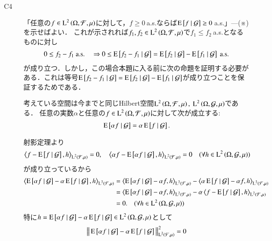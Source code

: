 \begin{prf}
\begin{description}
			\item[C4] 「任意の$f \in \operatorname{L}^{2} \left(\Omega, \mathcal{F},\mu\right)$に対して，$f \geq 0\ $a.s.ならば$\cexp{f}{\mathcal{G}} \geq 0\ $a.s.」---(※)を示せばよい．
				これが示されれば$f_1,f_2 \in \operatorname{L}^{2} \left(\Omega, \mathcal{F},\mu\right)$で$f_1 \leq f_2\ $a.s.となるものに対し
				\begin{align}
					0 \leq f_2 - f_1\ \mathrm{a.s.} \quad \Rightarrow 0 \leq \operatorname{E} \left[ f_2 - f_1 \ \middle|\ \mathcal{G} \right] = \operatorname{E} \left[ f_2 \ \middle|\ \mathcal{G} \right] - \operatorname{E} \left[ f_1 \ \middle|\ \mathcal{G} \right]\ \mathrm{a.s.}
				\end{align}
				が成り立つ．しかし，この場合本題に入る前に次の命題を証明する必要がある．これは等号$\operatorname{E} \left[ f_2 - f_1 \ \middle|\ \mathcal{G} \right] = \operatorname{E} \left[ f_2 \ \middle|\ \mathcal{G} \right] - \operatorname{E} \left[ f_1 \ \middle|\ \mathcal{G} \right]$が成り立つことを保証するためである．
				\begin{prp}
					考えている空間は今までと同じHilbert空間$\operatorname{L}^{2} \left(\Omega, \mathcal{F},\mu\right),\ \operatorname{L}^{2} \left(\Omega, \mathcal{G},\mu\right)$である．
					任意の実数$\alpha$と任意の$f \in \operatorname{L}^{2} \left(\Omega, \mathcal{F},\mu\right)$に対して次が成立する:
					\begin{align}
						\operatorname{E} \left[ \alpha f \ \middle|\ \mathcal{G} \right] = \alpha \operatorname{E} \left[ f \ \middle|\ \mathcal{G} \right].
					\end{align}
				\end{prp}
				\begin{prf}
					射影定理より
					\begin{align}
						\inprod<f - \cexp{f}{\mathcal{G}}, h>_{\Lp{2}{\mathcal{F},\mu}} = 0, \quad \inprod<\alpha f - \cexp{\alpha f}{\mathcal{G}}, h>_{\Lp{2}{\mathcal{F},\mu}} = 0 \quad (\forall h \in \Lp{2}{\Omega, \mathcal{G},\mu})
					\end{align}
					が成り立っているから
					\begin{align}
						\inprod<\cexp{\alpha f}{\mathcal{G}} - \alpha \cexp{f}{\mathcal{G}}, h>_{\Lp{2}{\mathcal{F},\mu}} 
						&= \inprod<\cexp{\alpha f}{\mathcal{G}} - \alpha f, h>_{\Lp{2}{\mathcal{F},\mu}} - \inprod<\alpha \cexp{f}{\mathcal{G}} - \alpha f, h>_{\Lp{2}{\mathcal{F},\mu}} \\
						&= \inprod<\cexp{\alpha f}{\mathcal{G}} - \alpha f, h>_{\Lp{2}{\mathcal{F},\mu}} - \alpha \inprod<f - \cexp{f}{\mathcal{G}}, h>_{\Lp{2}{\mathcal{F},\mu}} \\
						&= 0. \quad (\forall h \in \Lp{2}{\Omega, \mathcal{G},\mu})
					\end{align}
					特に$h = \operatorname{E} \left[ \alpha f \ \middle|\ \mathcal{G} \right] - \alpha \operatorname{E} \left[ f \ \middle|\ \mathcal{G} \right] \in \operatorname{L}^{2} \left(\Omega, \mathcal{G},\mu\right)$として
					\begin{align}
						\Norm{\cexp{\alpha f}{\mathcal{G}} - \alpha \cexp{f}{\mathcal{G}}}{\Lp{2}{\mathcal{F},\mu}}^2 = 0

\end{align}
\end{prf}
\end{description}
\end{prf}
